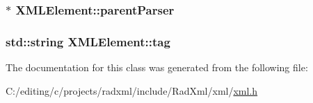 \hypertarget{class_x_m_l_element_a016e6b0f8fb87e7dae94e5d3aa08755c}{
\subsubsection[{parent\-Parser}]{$\ast$ X\-M\-L\-Element\-::parent\-Parser}}\label{class_x_m_l_element_a016e6b0f8fb87e7dae94e5d3aa08755c}
\hypertarget{class_x_m_l_element_a4f41640885a8b5dc7996f4828a129f59}{
\subsubsection[{tag}]{\setlength{\rightskip}{0pt plus 5cm}std\-::string X\-M\-L\-Element\-::tag}}\label{class_x_m_l_element_a4f41640885a8b5dc7996f4828a129f59}


The documentation for this class was generated from the following file\-:\begin{DoxyCompactItemize}
\item 
C\-:/editing/c/projects/radxml/include/\-Rad\-Xml/xml/\hyperlink{xml_8h}{xml.\-h}\end{DoxyCompactItemize}
